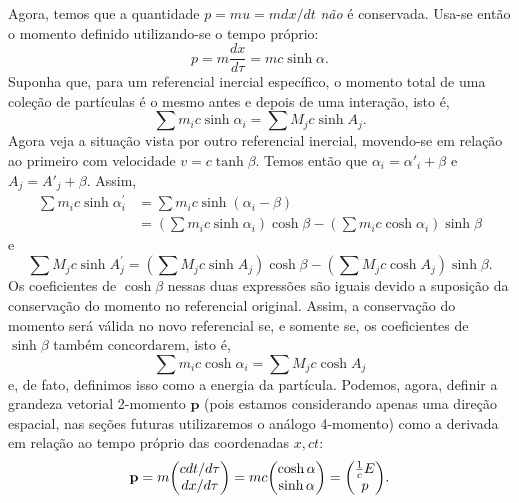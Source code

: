 Agora, temos que a quantidade $p=mu=mdx/dt$ \emph{não} é conservada. Usa-se então o momento definido utilizando-se o tempo próprio:
\[
    p = m\frac{dx}{d\tau}=mc\sinh\alpha.
\]
Suponha que, para um referencial inercial específico, o momento total de uma coleção de partículas é o mesmo antes e depois de uma interação, isto é,
\[
   \sum m_i c\sinh\alpha_i = \sum M_jc\sinh A_j .
\]
Agora veja a situação vista por outro referencial inercial, movendo-se em relação ao primeiro com velocidade $v = c\tanh\beta$. Temos então que $\alpha_i = \alpha'_i+\beta$ e $A_j = A'_j+\beta$. Assim,
\[
\begin{aligned} \sum m_{i} c \sinh \alpha_{i}^{\prime} &=\sum m_{i} c \sinh \left(\alpha_{i}-\beta\right) \\ &=\left(\sum m_{i} c \sinh \alpha_{i}\right) \cosh \beta-\left(\sum m_{i} c \cosh \alpha_{i}\right) \sinh \beta \end{aligned}  
\]
e
\[
    \sum M_{j} c \sinh A_{j}^{\prime}=\left(\sum M_{j} c \sinh A_{j}\right) \cosh \beta-\left(\sum M_{j} c \cosh A_{j}\right) \sinh \beta   .
\]
Os coeficientes de $\cosh\beta$ nessas duas expressões são iguais devido a suposição da conservação do momento no referencial original. Assim, a conservação do momento será válida no novo referencial se, e somente se, os coeficientes de $\sinh\beta$ também concordarem, isto é, 
\[ \sum m_i c\cosh\alpha_i = \sum M_jc\cosh A_j\]
e, de fato, definimos isso como a energia da partícula.
Podemos, agora, definir a grandeza vetorial 2-momento $\mathbf{p}$ (pois estamos considerando apenas uma direção espacial, nas seções futuras utilizaremos o análogo 4-momento) como a derivada em relação ao tempo próprio das coordenadas $x, ct$:
\begin{equation}
    \mathbf{p}=m \mqty(cdt/d\tau \\ dx/d\tau) = mc\mqty(\cosh\alpha \\ \sinh\alpha) = \mqty( \tfrac{1}{c}E \\ p).
\end{equation}